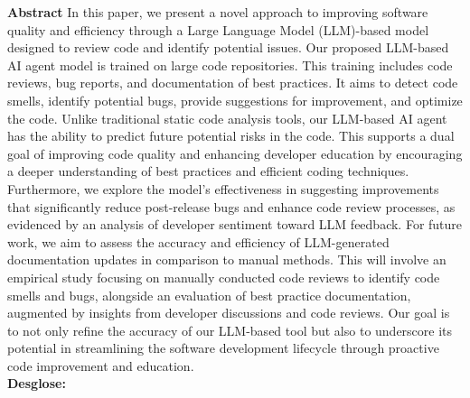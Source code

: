 \documentclass{article}
\begin{document}
\textbf{Abstract} In this paper, we present a novel approach to improving software quality and efficiency through a Large Language Model (LLM)-based model designed to review code and identify potential issues. Our proposed LLM-based AI agent model is trained on large code repositories. This training includes code reviews, bug reports, and documentation of best practices. It aims to detect code smells, identify potential bugs, provide suggestions for improvement, and optimize the code. Unlike traditional static code analysis tools, our LLM-based AI agent has the ability to predict future potential risks in the code. This supports a dual goal of improving code quality and enhancing developer education by encouraging a deeper understanding of best practices and efficient coding techniques. Furthermore, we explore the model's effectiveness in suggesting improvements that significantly reduce post-release bugs and enhance code review processes, as evidenced by an analysis of developer sentiment toward LLM feedback. For future work, we aim to assess the accuracy and efficiency of LLM-generated documentation updates in comparison to manual methods. This will involve an empirical study focusing on manually conducted code reviews to identify code smells and bugs, alongside an evaluation of best practice documentation, augmented by insights from developer discussions and code reviews. Our goal is to not only refine the accuracy of our LLM-based tool but also to underscore its potential in streamlining the software development lifecycle through proactive code improvement and education. \\

\textbf{Desglose:}
\end{document}
